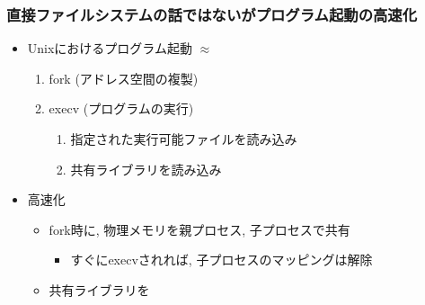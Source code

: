 \documentclass[12pt,dvipdfmx]{beamer}
\begin{document}
\begin{frame}
  \frametitle{{\tiny 直接ファイルシステムの話ではないが}プログラム起動の高速化}
  \begin{itemize}
  \item Unixにおけるプログラム起動 $\approx$
    \begin{enumerate}
    \item fork (アドレス空間の複製)
    \item execv (プログラムの実行)
      \begin{enumerate}
      \item 指定された実行可能ファイルを読み込み
      \item 共有ライブラリを読み込み
      \end{enumerate}
    \end{enumerate}
  \item 高速化
    \begin{itemize}
    \item fork時に, 物理メモリを親プロセス, 子プロセスで共有
      \begin{itemize}
      \item すぐにexecvされれば, 子プロセスのマッピングは解除
      \end{itemize}
    \item 共有ライブラリを
    \end{itemize}
  \end{itemize}
\end{frame}
\end{document}
